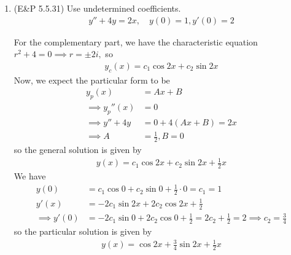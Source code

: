 \documentclass{article}
\begin{document}
\begin{enumerate}
	\item (E\&P 5.5.31) Use undetermined coefficients.
		\begin{align*}
			y''+4y=2x, \quad y(0)=1, y'(0)=2
		\end{align*}
		\begin{soln}
			For the complementary part, we have the characteristic equation $r^2+4=0\implies r=\pm 2i,$ so
			\begin{align*}
				y_c(x) = c_1\cos 2x + c_2\sin 2x
			\end{align*}
			Now, we expect the particular form to be
			\begin{align*}
				y_p(x) &= Ax+B \\
				\implies y_p''(x) &= 0 \\
				\implies y'' + 4y &= 0 + 4(Ax+B) = 2x \\
				\implies A &= \frac{1}{2}, B = 0
			\end{align*}
			so the general solution is given by
			\begin{align*}
				y(x) = c_1\cos 2x + c_2\sin 2x + \frac{1}{2}x
			\end{align*}
			We have
			\begin{align*}
				y(0) &= c_1\cos 0 + c_2\sin 0 + \frac{1}{2}\cdot 0 = c_1 = 1\\
				y'(x) &= -2c_1\sin 2x + 2c_2\cos 2x + \frac{1}{2} \\
				\implies y'(0) &= -2c_1\sin 0 + 2c_2\cos 0 + \frac{1}{2} = 2c_2+\frac{1}{2} = 2\implies c_2 = \frac{3}{4}
			\end{align*}
			so the particular solution is given by
			\begin{align*}
				y(x) = \cos 2x + \frac{3}{4}\sin 2x + \frac{1}{2}x
			\end{align*}

		\end{soln}


\end{enumerate}
\end{document}
